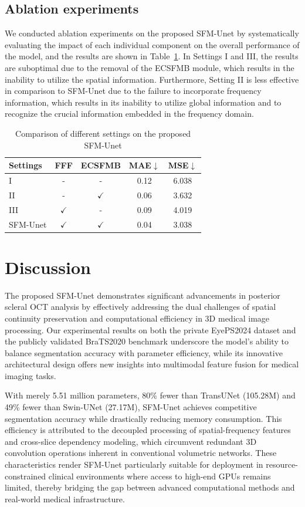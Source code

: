 \documentclass[AMA,Times1COL]{WileyNJDv5} %
\begin{document}
\subsection{Ablation experiments}
We conducted ablation experiments on the proposed SFM-Unet by systematically evaluating the impact of each individual component on the overall performance of the model, and the results are shown in Table~\ref{tab:comparison_settings}. In Settings I and III, the results are suboptimal due to the removal of the ECSFMB module, which results in the inability to utilize the spatial information. Furthermore, Setting II is less effective in comparison to SFM-Unet due to the failure to incorporate frequency information, which results in its inability to utilize global information and to recognize the crucial information embedded in the frequency domain.
\begin{table}[htbp]
\centering
\scriptsize
\caption{Comparison of different settings on the proposed SFM-Unet}
\begin{tabular}{lcccc}
\toprule
\textbf{Settings} & \textbf{FFF} & \textbf{ECSFMB} & \textbf{MAE$\downarrow$} & \textbf{MSE$\downarrow$} \\
\midrule
I & - & - & 0.12 & 6.038 \\
II & - & $\checkmark$ & 0.06 & 3.632 \\
III & $\checkmark$ & - & 0.09 & 4.019 \\
\midrule
SFM-Unet & $\checkmark$ & $\checkmark$ & 0.04 & 3.038 \\
\bottomrule
\end{tabular}
\label{tab:comparison_settings}
\end{table}

\section{Discussion}
The proposed SFM-Unet demonstrates significant advancements in posterior scleral OCT analysis by effectively addressing the dual challenges of spatial continuity preservation and computational efficiency in 3D medical image processing. Our experimental results on both the private EyePS2024 dataset and the publicly validated BraTS2020 benchmark underscore the model’s ability to balance segmentation accuracy with parameter efficiency, while its innovative architectural design offers new insights into multimodal feature fusion for medical imaging tasks.

With merely 5.51 million parameters, 80\% fewer than TransUNet (105.28M) and 49\% fewer than Swin-UNet (27.17M), SFM-Unet achieves competitive segmentation accuracy while drastically reducing memory consumption. This efficiency is attributed to the decoupled processing of spatial-frequency features and cross-slice dependency modeling, which circumvent redundant 3D convolution operations inherent in conventional volumetric networks. These characteristics render SFM-Unet particularly suitable for deployment in resource-constrained clinical environments where access to high-end GPUs remains limited, thereby bridging the gap between advanced computational methods and real-world medical infrastructure.  
\end{document}
